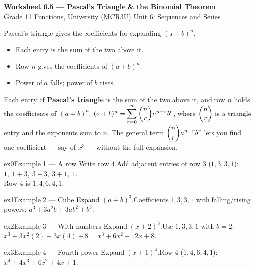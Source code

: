 \documentclass[11pt]{article}
\begin{document}
\begin{center}
{\LARGE\bfseries\color{titleblue}Worksheet 6.5 --- Pascal's Triangle \& the Binomial Theorem}\\[2pt]
{\small Grade 11 Functions, University (MCR3U) \textperiodcentered{} Unit 6: Sequences and Series}
\end{center}

\begin{ideabox}
Pascal's triangle gives the coefficients for expanding $(a+b)^n$.
\begin{itemize}[leftmargin=*,itemsep=2pt]
  \item Each entry is the sum of the two above it.
  \item Row $n$ gives the coefficients of $(a+b)^n$.
  \item Power of $a$ falls; power of $b$ rises.
\end{itemize}
\end{ideabox}

\begin{learnbox}
Each entry of \textbf{Pascal's triangle} is the sum of the two above it, and row $n$ holds the coefficients of $(a+b)^n$.
$(a+b)^n=\displaystyle\sum_{r=0}^{n}\dbinom{n}{r}a^{n-r}b^{r}$, where $\dbinom{n}{r}$ is a triangle entry and the exponents sum to $n$.
The general term $\dbinom{n}{r}a^{n-r}b^{r}$ lets you find one coefficient — say of $x^3$ — without the full expansion.
\end{learnbox}


\begin{example}{ex0}{Example 1 --- A row}
Write row $4$.\soln Add adjacent entries of row 3 ($1,3,3,1$): $1,\ 1{+}3,\ 3{+}3,\ 3{+}1,\ 1$. \\ Row 4 is $1,4,6,4,1$.
\end{example}

\begin{example}{ex1}{Example 2 --- Cube}
Expand $(a+b)^3$.\soln Coefficients $1,3,3,1$ with falling/rising powers: $a^3+3a^2b+3ab^2+b^3$.
\end{example}

\begin{example}{ex2}{Example 3 --- With numbers}
Expand $(x+2)^3$.\soln Use $1,3,3,1$ with $b=2$: $x^3+3x^2(2)+3x(4)+8=x^3+6x^2+12x+8$.
\end{example}

\begin{example}{ex3}{Example 4 --- Fourth power}
Expand $(x+1)^4$.\soln Row 4 ($1,4,6,4,1$): $x^4+4x^3+6x^2+4x+1$.
\end{example}
\end{document}
